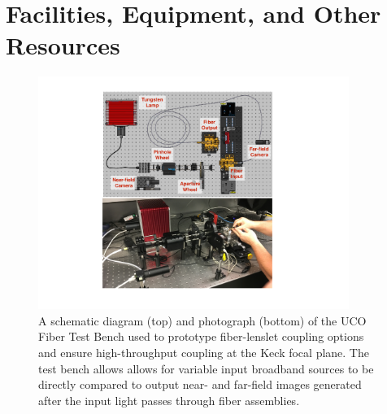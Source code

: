 \documentclass[oneside,11pt]{amsart}
\begin{document}


\newpage

\setcounter{page}{1}



\newpage

\setcounter{page}{1}

\section{Facilities, Equipment, and Other Resources}

\begin{figure}[h!]
%
\vskip -0.1in
%
\includegraphics[width=0.9\textwidth]{figs/test_bench.pdf}
%
\caption{\small  A schematic diagram (top) and photograph (bottom) of
the UCO Fiber Test Bench used to prototype fiber-lenslet coupling
options and ensure high-throughput coupling at the Keck focal plane.
The test bench allows allows for variable input broadband sources to be
directly compared to output near- and far-field images generated after
the input light passes through fiber assemblies.}
%
\label{fig:testbench}
%
\end{figure}
\end{document}
